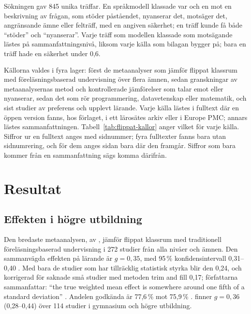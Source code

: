 Sökningen gav 845 unika träffar. En språkmodell klassade var och en mot en
beskrivning av frågan, som stöder påståendet, nyanserar det, motsäger det,
angränsande ämne eller felträff, med en angiven säkerhet; en träff kunde
få både \enquote{stöder} och \enquote{nyanserar}. Varje träff som modellen
klassade som motsägande lästes på sammanfattningsnivå, liksom varje källa
som bilagan bygger på; bara en träff hade en säkerhet under 0,6.

Källorna valdes i fyra lager: först de metaanalyser som jämför flippat
klassrum med föreläsningsbaserad undervisning över flera ämnen, sedan
granskningar av metaanalysernas metod och kontrollerade jämförelser som
talar emot eller nyanserar, sedan det som rör programmering, datavetenskap
eller matematik, och sist studier av preferens och upplevt lärande. Varje
källa lästes i fulltext där en öppen version fanns, hos förlaget, i ett
lärosätes arkiv eller i Europe PMC; annars lästes sammanfattningen.
Tabell~\ref{tab:flippat-kallor} anger vilket för varje källa. Siffror ur
en fulltext anges med sidnummer; fyra fulltexter fanns bara utan
sidnumrering, och för dem anges sidan bara där den framgår. Siffror som
bara kommer från en sammanfattning sägs komma därifrån.

\section{Resultat}

\subsection{Effekten i högre utbildning}

Den bredaste metaanalysen, av \textcite{LagSaele2019}, jämför flippat
klassrum med traditionell föreläsningsbaserad undervisning i 272 studier
från alla nivåer och ämnen. Den sammanvägda effekten på lärande är
\(g = 0{,}35\), med 95\,\% konfidensintervall 0,31--0,40
\parencite[1]{LagSaele2019}. Med bara de studier som har tillräcklig
statistisk styrka blir den 0,24, och korrigerad för saknade små studier
med metoden \foreignlanguage{english}{trim and fill} 0,17; författarna
sammanfattar: \enquote{the true weighted mean effect is somewhere around
one fifth of a standard deviation} \parencite[9]{LagSaele2019}. Andelen
godkända är 77,6\,\% mot 75,9\,\% \parencite[7]{LagSaele2019}.
\textcite[s.~8 och tabell~3, s.~10]{vanAlten2019} finner \(g = 0{,}36\)
(0,28--0,44) över 114 studier i gymnasium och högre utbildning.

